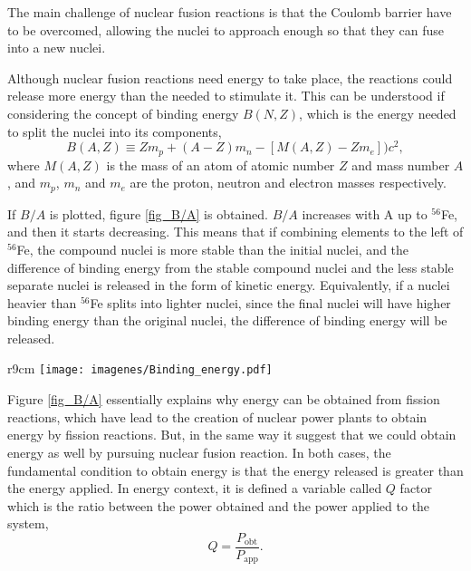\documentclass[a4paper,12pt,oneside]{book}
\begin{document}
The main challenge of nuclear fusion reactions is that the Coulomb barrier have to be overcomed, allowing the nuclei to approach enough so that they can fuse into a new nuclei.

Although nuclear fusion reactions need energy to take place, the reactions could release more energy than the needed to stimulate it. This can be understood if considering the concept of binding energy $B(N,Z)$, which is the energy needed to split the nuclei into its components, 
%
\begin{equation}
B(A,Z) \equiv Zm_p+(A-Z)m_n-[M(A,Z)-Zm_e])c^2,
\end{equation} 
where $M(A,Z)$ is the mass of an atom of atomic number $Z$ and mass number $A$, and $m_p$, $m_n$ and $m_e$ are the proton, neutron and electron masses respectively. 

If $B/A$ is plotted, figure \ref{fig_B/A}  is obtained. $B/A$ increases with A up to $^{56}$Fe, and then it starts decreasing. This means that if combining elements to the left of $^{56}$Fe, the compound nuclei is more stable than the initial nuclei, and the difference of binding energy from the stable compound nuclei and the less stable separate nuclei is released in the form of kinetic energy. Equivalently, if a nuclei heavier than $^{56}$Fe splits into lighter nuclei, since the final nuclei will have higher binding energy than the original nuclei, the difference of binding energy will be released.

\begin{wrapfigure}{r}{9cm}
\centering
\texttt{[image: imagenes/Binding\_energy.pdf]}
\caption{Binding energy per nucleon. The maximum $B/A$ correspond to $^{56}$Fe, the most stable element. Source: \cite{Krane}.}
\label{fig_B/A}
\end{wrapfigure} 

Figure \ref{fig_B/A} essentially explains why energy can be obtained from fission reactions, which have lead to the creation of nuclear power plants to obtain energy by fission reactions. But, in the same way it suggest that we could obtain energy as well by pursuing nuclear fusion reaction. In both cases, the fundamental condition to obtain energy is that the energy released is greater than the energy applied. In energy context, it is defined a variable called $Q$ factor which is the ratio between the power obtained and the power applied to the system,
%
\begin{equation}
Q=\dfrac{P_\text{obt}}{P_\text{app}}.
\end{equation} 
\end{document}
